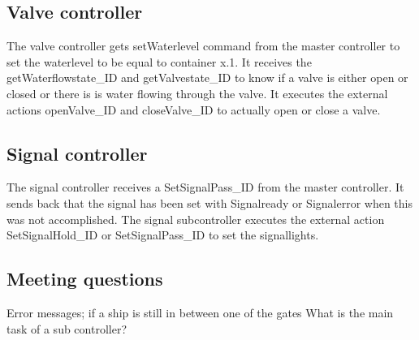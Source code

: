 \subsection{Valve controller}
The valve controller gets setWaterlevel command from the master controller to set the waterlevel to be equal to container x.1. It receives the getWaterflowstate\_ID and getValvestate\_ID to know if a valve is either open or closed or there is is water flowing through the valve. It executes the external actions openValve\_ID and closeValve\_ID to actually open or close a valve.  
\subsection{Signal controller}
The signal controller receives a SetSignalPass\_ID from the master controller. It sends back that the signal has been set with Signalready or Signalerror when this was not accomplished. The signal subcontroller executes the external action SetSignalHold\_ID or SetSignalPass\_ID to set the signallights. 
\subsection{Meeting questions}
Error messages; if a ship is still in between one of the gates
What is the main task of a sub controller?
 